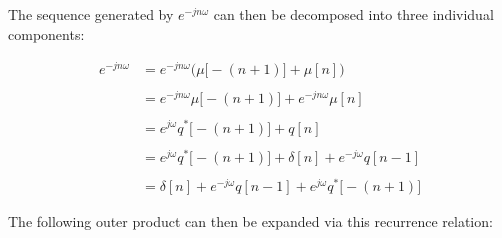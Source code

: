\documentclass{article}
\begin{document}
The sequence generated by $e^{-jn\omega}$ can then be decomposed into three individual components:

\begin{align*}
    e^{-jn\omega}&= e^{-jn\omega}\bigg(\mu\big[-(n + 1)\big] + \mu[n]\bigg) \\ \\
                 &= e^{-jn\omega}\mu\big[-(n + 1)\big] + e^{-jn\omega}\mu[n] \\ \\
                 &= e^{j\omega}q^{*}\big[-(n + 1)\big] + q[n] \\ \\
                 &= e^{j\omega}q^{*}\big[-(n + 1)\big] + \delta[n] + e^{-j\omega}q[n - 1] \\ \\
                 &= \delta[n] + e^{-j\omega}q[n - 1] + e^{j\omega}q^{*}\big[-(n + 1)\big]
  \end{align*}\newline

The following outer product can then be expanded via this recurrence relation:
\end{document}
